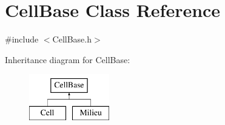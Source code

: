 \hypertarget{class_cell_base}{\section{\-Cell\-Base \-Class \-Reference}
\label{class_cell_base}
}


{\ttfamily \#include $<$\-Cell\-Base.\-h$>$}

\-Inheritance diagram for \-Cell\-Base\-:\begin{figure}[H]
\begin{center}
\leavevmode
\includegraphics[height=2.000000cm]{class_cell_base}
\end{center}
\end{figure}
